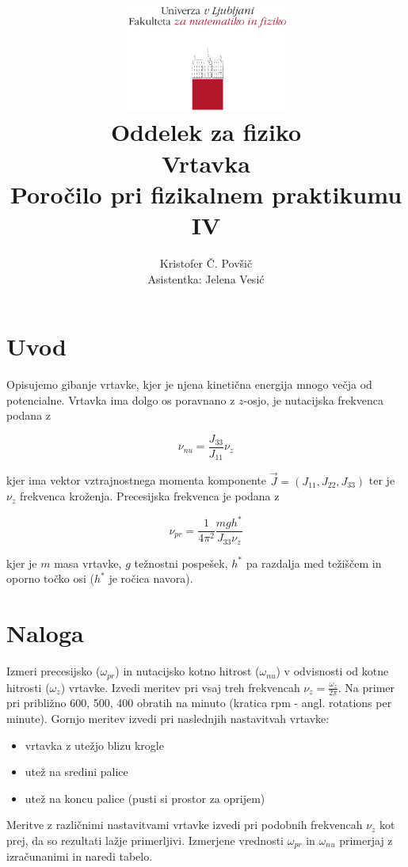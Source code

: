 \documentclass[12pt]{report}
\title{
  \includegraphics[width=0.4\textwidth]{fmf_logo}\\
  {\small Oddelek za fiziko} \\
  {Vrtavka}\\
  {\small Poročilo pri fizikalnem praktikumu IV}\\

}
\date{}
\author{ Kristofer Č. Povšič \\[5 cm]
 \small Asistentka: Jelena Vesić \\
}
\begin{document}
\setcounter{page}{2}

\maketitle

\chapter*{Uvod}

Opisujemo gibanje vrtavke, kjer je njena kinetična energija mnogo večja od potencialne. Vrtavka ima dolgo os poravnano z $z$-osjo, je nutacijska frekvenca podana z 

\begin{equation}
  \nu_{nu} = \frac{J_{33}}{J_{11}}\nu_z
\end{equation}

kjer ima vektor vztrajnostnega momenta komponente $\vec{J} = (J_{11}, J_{22}, J_{33})$ ter je $\nu_z$ frekvenca kroženja. Precesijska frekvenca je podana z

\begin{equation}
  \nu_{pr} = \frac{1}{4\pi^2}\frac{mgh^*}{J_{33}\nu_z}
\end{equation}

kjer je $m$ masa vrtavke, $g$ težnostni pospešek, $h^*$ pa razdalja med težiščem in oporno točko osi ($h^*$ je ročica navora). 

\chapter*{Naloga}

Izmeri precesijsko ($\omega_{pr}$) in nutacijsko kotno hitrost ($\omega_{nu}$) v odvisnosti od kotne hitrosti ($\omega_z$) vrtavke. Izvedi meritev pri vsaj treh frekvencah $\nu_z = \frac{\omega_z}{2\pi}$. Na primer pri približno 600, 500, 400 obratih na minuto (kratica rpm - angl. rotations per minute). Gornjo meritev izvedi pri naslednjih nastavitvah vrtavke: 
\begin{itemize}
  \item vrtavka z utežjo blizu krogle
  \item utež na sredini palice 
  \item utež na koncu palice (pusti si prostor za oprijem)
\end{itemize}
Meritve z različnimi nastavitvami vrtavke izvedi pri podobnih frekvencah $\nu_z$ kot prej, da so rezultati lažje primerljivi. Izmerjene vrednosti $\omega_{pr}$ in $\omega_{nu}$ primerjaj z izračunanimi in naredi tabelo. 
\end{document}
